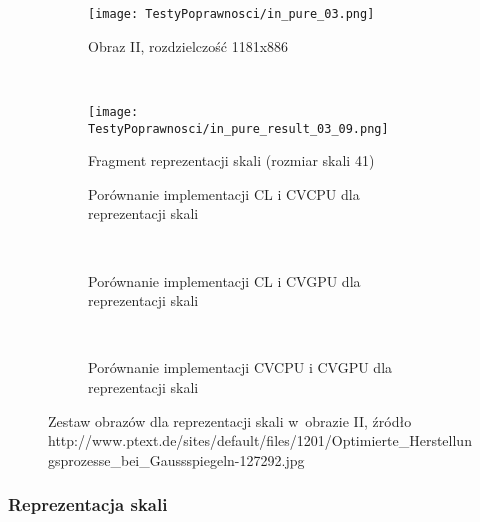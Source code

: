 \begin{figure}[H]
\begin{center}
\begin{subfigure}[t]{0.3\textwidth}
\texttt{[image: TestyPoprawnosci/in\_pure\_03.png]}
\caption{Obraz II, rozdzielczość 1181x886}
\label{fig:valPure03}
\end{subfigure}
~
\begin{subfigure}[t]{0.3\textwidth}
\begin{center}
\texttt{[image: TestyPoprawnosci/in\_pure\_result\_03\_09.png]}
\end{center}
\caption{Fragment reprezentacji skali (rozmiar skali 41)}
\label{fig:valPure03}
\end{subfigure}
\end{center}

\begin{subfigure}[t]{0.3\textwidth}
	\centering
	\setlength\fboxsep{0pt}
	\setlength\fboxrule{0.5pt}
	\caption{Porównanie implementacji CL i CVCPU dla reprezentacji skali}
	\label{fig:valPure3CLCVCPU}
\end{subfigure}
~
\begin{subfigure}[t]{0.3\textwidth}
	\centering
	\setlength\fboxsep{0pt}
	\setlength\fboxrule{0.5pt}
	\caption{Porównanie implementacji CL i CVGPU dla reprezentacji skali}
	\label{fig:valPure3CLCVGPU}
\end{subfigure}
~
\begin{subfigure}[t]{0.3\textwidth}
	\centering
	\setlength\fboxsep{0pt}
	\setlength\fboxrule{0.5pt}
	\caption{Porównanie implementacji CVCPU i CVGPU dla reprezentacji skali}
	\label{fig:valPure3CVCPUCVGPU}                 
\end{subfigure}
\caption{Zestaw obrazów dla reprezentacji skali w~obrazie II, \tiny{źródło http://www.ptext.de/sites/default/files/1201/Optimierte\_Herstellungsprozesse\_bei\_Gaussspiegeln-127292.jpg}}

\label{fig:valPure3}
\end{figure}

\subsubsection{Reprezentacja skali}
\label{subsubsec:reprezentacjaSkaliRysunki}



